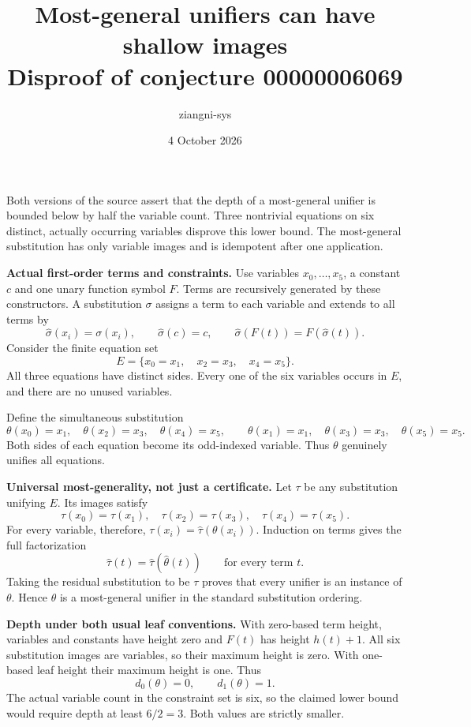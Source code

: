 \documentclass[11pt]{article}
\title{Most-general unifiers can have shallow images\\
\large Disproof of conjecture 00000006069}
\author{ziangni-sys}
\date{4 October 2026}
\begin{document}
\maketitle
Both versions of the source assert that the depth of a most-general
unifier is bounded below by half the variable count.
Three nontrivial equations on six distinct, actually occurring
variables disprove this lower bound. The most-general substitution
has only variable images and is idempotent after one application.

\textbf{Actual first-order terms and constraints.}
Use variables $x_0,\ldots,x_5$, a constant $c$ and one unary function
symbol $F$. Terms are recursively generated by these constructors.
A substitution $\sigma$ assigns a term to each variable and extends
to all terms by
\[
 \widehat\sigma(x_i)=\sigma(x_i),\qquad
 \widehat\sigma(c)=c,\qquad
 \widehat\sigma(F(t))=F(\widehat\sigma(t)).
\]
Consider the finite equation set
\[
 E=\{x_0=x_1,\quad x_2=x_3,\quad x_4=x_5\}.
\]
All three equations have distinct sides. Every one of the six
variables occurs in $E$, and there are no unused variables.

Define the simultaneous substitution
\[
 \theta(x_0)=x_1,\quad \theta(x_2)=x_3,\quad \theta(x_4)=x_5,
 \qquad
 \theta(x_1)=x_1,\quad\theta(x_3)=x_3,\quad\theta(x_5)=x_5.
\]
Both sides of each equation become its odd-indexed variable.
Thus $\theta$ genuinely unifies all equations.

\textbf{Universal most-generality, not just a certificate.}
Let $\tau$ be any substitution unifying $E$. Its images satisfy
\[
 \tau(x_0)=\tau(x_1),\quad
 \tau(x_2)=\tau(x_3),\quad
 \tau(x_4)=\tau(x_5).
\]
For every variable, therefore,
$\tau(x_i)=\widehat\tau(\theta(x_i))$.
Induction on terms gives the full factorization
\[
 \widehat\tau(t)=\widehat\tau(\widehat\theta(t))
 \qquad\text{for every term }t.
\]
Taking the residual substitution to be $\tau$ proves that every
unifier is an instance of $\theta$. Hence $\theta$ is a
most-general unifier in the standard substitution ordering.

\newpage
\textbf{Depth under both usual leaf conventions.}
With zero-based term height, variables and constants have height
zero and $F(t)$ has height $h(t)+1$.
All six substitution images are variables, so their maximum height
is zero. With one-based leaf height their maximum height is one.
Thus
\[
 d_0(\theta)=0,\qquad d_1(\theta)=1.
\]
The actual variable count in the constraint set is six, so the
claimed lower bound would require depth at least $6/2=3$.
Both values are strictly smaller.
\end{document}
